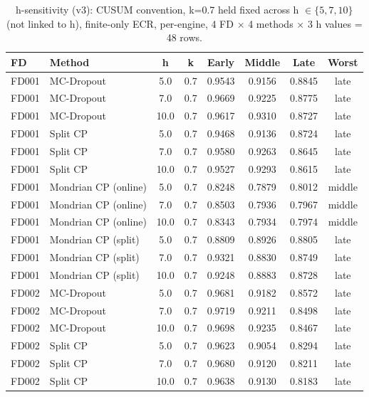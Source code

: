 \begin{table}[t]
\caption{h-sensitivity (v3): CUSUM convention, k=0.7 held fixed across h $\in \{5, 7, 10\}$ (not linked to h), finite-only ECR, per-engine, 4 FD $\times$ 4 methods $\times$ 3 h values = 48 rows.}
\label{tab:h-sensitivity-v3}
\centering
\small
\begin{tabular}{llcccccc}
\toprule
FD & Method & h & k & Early & Middle & Late & Worst \\
\midrule
FD001 & MC-Dropout & 5.0 & 0.7 & 0.9543 & 0.9156 & 0.8845 & late \\
FD001 & MC-Dropout & 7.0 & 0.7 & 0.9669 & 0.9225 & 0.8775 & late \\
FD001 & MC-Dropout & 10.0 & 0.7 & 0.9617 & 0.9310 & 0.8727 & late \\
FD001 & Split CP & 5.0 & 0.7 & 0.9468 & 0.9136 & 0.8724 & late \\
FD001 & Split CP & 7.0 & 0.7 & 0.9580 & 0.9263 & 0.8645 & late \\
FD001 & Split CP & 10.0 & 0.7 & 0.9527 & 0.9293 & 0.8615 & late \\
FD001 & Mondrian CP (online) & 5.0 & 0.7 & 0.8248 & 0.7879 & 0.8012 & middle \\
FD001 & Mondrian CP (online) & 7.0 & 0.7 & 0.8503 & 0.7936 & 0.7967 & middle \\
FD001 & Mondrian CP (online) & 10.0 & 0.7 & 0.8343 & 0.7934 & 0.7974 & middle \\
FD001 & Mondrian CP (split) & 5.0 & 0.7 & 0.8809 & 0.8926 & 0.8805 & late \\
FD001 & Mondrian CP (split) & 7.0 & 0.7 & 0.9321 & 0.8830 & 0.8749 & late \\
FD001 & Mondrian CP (split) & 10.0 & 0.7 & 0.9248 & 0.8883 & 0.8728 & late \\
FD002 & MC-Dropout & 5.0 & 0.7 & 0.9681 & 0.9182 & 0.8572 & late \\
FD002 & MC-Dropout & 7.0 & 0.7 & 0.9719 & 0.9211 & 0.8498 & late \\
FD002 & MC-Dropout & 10.0 & 0.7 & 0.9698 & 0.9235 & 0.8467 & late \\
FD002 & Split CP & 5.0 & 0.7 & 0.9623 & 0.9054 & 0.8294 & late \\
FD002 & Split CP & 7.0 & 0.7 & 0.9680 & 0.9120 & 0.8211 & late \\
FD002 & Split CP & 10.0 & 0.7 & 0.9638 & 0.9130 & 0.8183 & late \\

\end{tabular}
\end{table}
